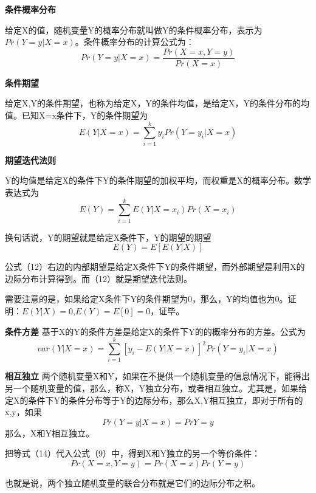 \documentclass[cn,10pt,math=newtx,citestyle=gb7714-2015,bibstyle=gb7714-2015]{elegantbook}
\begin{document}
	\textbf{条件概率分布}
	
	给定X的值，随机变量Y的概率分布就叫做Y的条件概率分布，表示为$Pr(Y=y|X=x)$。条件概率分布的计算公式为：
	\begin{equation}
		Pr(Y=y|X=x)=\frac{Pr(X=x,Y=y)}{Pr(X=x)}
	\end{equation}
	
	\textbf{条件期望}
	
	给定X,Y的条件期望，也称为给定X，Y的条件均值，是给定X，Y的条件分布的均值。已知X=x条件下，Y的条件期望为
	\begin{equation}
		E(Y|X=x)=\sum_{i=1}^{k}{y_iPr(Y=y_i|X=x)}
	\end{equation}
	
	\textbf{期望迭代法则}
	
	Y的均值是给定X的条件下Y的条件期望的加权平均，而权重是X的概率分布。数学表达式为
	\begin{equation}
		E(Y)=\sum_{i=1}^{k}{E(Y|X=x_i)Pr(X=x_i)}
	\end{equation}
	
	换句话说，Y的期望就是给定X条件下，Y的期望的期望
	\begin{equation}
		E(Y)=E[E(Y|X)]
	\end{equation}
	
	公式（12）右边的内部期望是给定X条件下Y的条件期望，而外部期望是利用X的边际分布计算得到。而（12）就是期望迭代法则。
	
	需要注意的是，如果给定X条件下Y的条件期望为0，那么，Y的均值也为0。证明：$E(Y|X)=0$,$E(Y)=E[0]=0$，证毕。
	
	\textbf{条件方差}
	基于X的Y的条件方差是给定X的条件下Y的的概率分布的方差。公式为
	\begin{equation}
		var(Y|X=x)=\sum_{i=1}^{k}{[y_i-E(Y|X=x)]^2Pr(Y=y_i|X=x)}
	\end{equation}
	
	\textbf{相互独立}
	两个随机变量X和Y，如果在不提供一个随机变量的信息情况下，能得出另一个随机变量的值，那么，称X，Y独立分布，或者相互独立。尤其是，如果给定X的条件下Y的条件分布等于Y的边际分布，那么X,Y相互独立，即对于所有的x,y，如果
	\begin{equation}
		Pr(Y=y|X=x)=Pr{Y=y}
	\end{equation}
	那么，X和Y相互独立。
	
	把等式（14）代入公式（9）中，得到X和Y独立的另一个等价条件：\begin{equation}
		Pr(X=x,Y=y)=Pr(X=x)Pr(Y=y)
	\end{equation}
	
	也就是说，两个独立随机变量的联合分布就是它们的边际分布之积。
	
\end{document}
